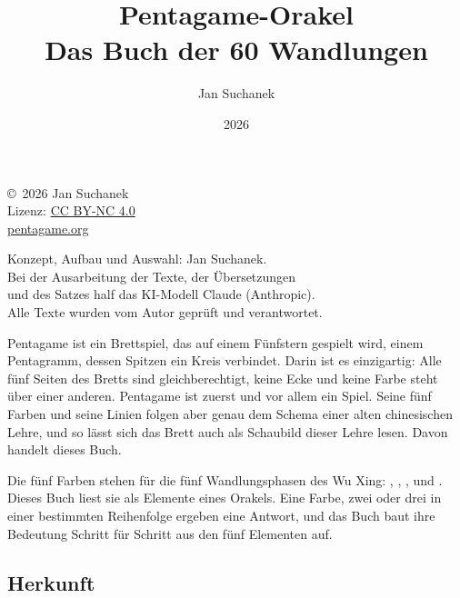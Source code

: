 \documentclass[12pt,paper=a5,DIV=13,headings=small,twoside=true,open=any]{scrbook}
\title{Pentagame-Orakel\\[0.3em]\large Das Buch der 60 Wandlungen}
\author{Jan Suchanek}
\date{2026}
\begin{document}
\frontmatter
\maketitle
\thispagestyle{empty}
\null\vfill
{\centering
  \copyright\ 2026 Jan Suchanek\\
  Lizenz: \href{https://creativecommons.org/licenses/by-nc/4.0/deed.de}{CC BY-NC 4.0}\\
  \href{https://pentagame.org/}{pentagame.org}\par}
\bigskip
{\small\centering
  Konzept, Aufbau und Auswahl: Jan Suchanek.\\
  Bei der Ausarbeitung der Texte, der Übersetzungen\\
  und des Satzes half das KI-Modell Claude (Anthropic).\\
  Alle Texte wurden vom Autor geprüft und verantwortet.\par}
\clearpage
\tableofcontents
\clearpage\ifodd\value{page}\else\hbox{}\thispagestyle{empty}\clearpage\fi
\mainmatter

\label{kap:einfuehrung}


Pentagame ist ein Brettspiel, das auf einem Fünfstern gespielt wird, einem Pentagramm, dessen Spitzen ein Kreis verbindet. Darin ist es einzigartig: Alle fünf Seiten des Bretts sind gleichberechtigt, keine Ecke und keine Farbe steht über einer anderen. Pentagame ist zuerst und vor allem ein Spiel. Seine fünf Farben und seine Linien folgen aber genau dem Schema einer alten chinesischen Lehre, und so lässt sich das Brett auch als Schaubild dieser Lehre lesen. Davon handelt dieses Buch.

Die fünf Farben stehen für die fünf Wandlungsphasen des Wu Xing: , , ,  und . Dieses Buch liest sie als Elemente eines Orakels. Eine Farbe, zwei oder drei in einer bestimmten Reihenfolge ergeben eine Antwort, und das Buch baut ihre Bedeutung Schritt für Schritt aus den fünf Elementen auf.

\subsection*{Herkunft}
\end{document}
